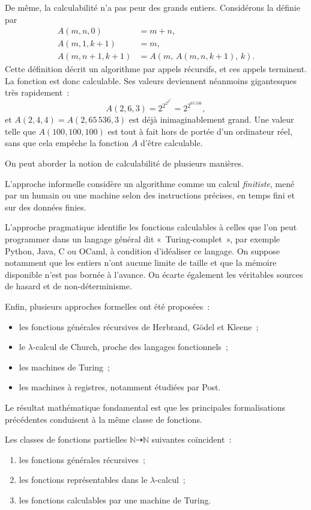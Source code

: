 De même, la calculabilité n'a pas peur des grands entiers.  Considérons
la  définie par
\[
\begin{aligned}
A(m,n,0) &= m+n,\\
A(m,1,k+1) &= m,\\
A(m,n+1,k+1) &= A(m,\,A(m,n,k+1),\,k).
\end{aligned}
\]
Cette définition décrit un algorithme par appels récursifs, et ces
appels terminent.  La fonction est donc calculable.  Ses valeurs
deviennent néanmoins gigantesques très rapidement :
\[
A(2,6,3)
 = 2^{2^{2^{2^{2^2}}}}
 = 2^{2^{65\,536}},
\]
et $A(2,4,4)=A(2,65\,536,3)$ est déjà inimaginablement grand.
Une valeur telle que $A(100,100,100)$ est tout à fait hors de portée
d'un ordinateur réel, sans que cela empêche la fonction $A$ d'être
calculable.

\thingy On peut aborder la notion de calculabilité de plusieurs
manières.

L'approche informelle considère un algorithme comme un calcul
\emph{finitiste}, mené par un humain ou une machine selon des
instructions précises, en temps fini et sur des données finies.

L'approche pragmatique identifie les fonctions calculables à celles
que l'on peut programmer dans un langage général dit
« Turing-complet », par exemple Python, Java, C ou OCaml, à condition
d'idéaliser ce langage.  On suppose notamment que les entiers n'ont
aucune limite de taille et que la mémoire disponible n'est pas bornée
à l'avance.  On écarte également les véritables sources de hasard et
de non-déterminisme.

Enfin, plusieurs approches formelles ont été proposées :
\begin{itemize}
\item les fonctions générales récursives de Herbrand, Gödel et Kleene ;
\item le $\lambda$-calcul de Church, proche des langages fonctionnels ;
\item les machines de Turing ;
\item les machines à registres, notamment étudiées par Post.
\end{itemize}

\thingy Le résultat mathématique fondamental est que les principales
formalisations précédentes conduisent à la même classe de fonctions.

\begin{thm}\label{church-turing-equivalence}
Les classes de fonctions partielles
$\mathbb{N}\dasharrow\mathbb{N}$ suivantes coïncident :
\begin{enumerate}
\item les fonctions générales récursives ;
\item les fonctions représentables dans le $\lambda$-calcul ;
\item les fonctions calculables par une machine de Turing.
\end{enumerate}
\end{thm}

